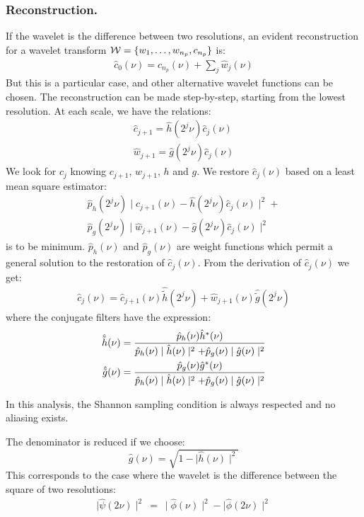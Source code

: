 \subsubsection*{Reconstruction.}
If the wavelet is the difference between two resolutions,
an evident reconstruction for a wavelet transform 
${\cal W} = \{w_1,\dots, w_{n_p}, c_{n_p}\}$ is:
\begin{eqnarray}
\hat c_0(\nu) = \hat c_{n_p}(\nu) + \sum_j \hat w_j(\nu)
\end{eqnarray}
But this is a particular case, and other alternative wavelet functions can be
chosen. The reconstruction can be made step-by-step, starting from
the lowest resolution. At each scale, we have the relations:
\begin{eqnarray}
\hat c_{j+1} = \hat h(2^j \nu) \hat c_j(\nu) \\
\hat w_{j+1} = \hat g(2^j \nu) \hat c_j(\nu) 
\end{eqnarray}
We look for $c_j$ knowing $c_{j+1}$, $w_{j+1}$, $h$ and $g$.
We restore $\hat c_j(\nu)$ based on a least mean square estimator:
\begin{eqnarray}
\hat p_h(2^j\nu) \mid \hat c_{j+1}(\nu)-\hat h(2^j\nu)\hat c_j(\nu) \mid^2 + 
\nonumber \\
\hat p_g(2^j\nu) \mid \hat w_{j+1}(\nu)-\hat g(2^j\nu)\hat c_j(\nu) \mid^2
\end{eqnarray}
is to be minimum. $\hat p_h(\nu)$ and $\hat p_g(\nu)$ are weight
functions which permit a general solution to the
restoration of $\hat c_j(\nu)$. From the derivation of $\hat c_j(\nu)$  we get:
\begin{eqnarray}
\hat{c}_{j}(\nu)=\hat{c}_{j+1}(\nu) \hat{\tilde h}(2^{j}\nu)
                +\hat{w}_{j+1}(\nu) \hat{\tilde g}(2^{j}\nu)
\label{restauration}
\end{eqnarray} 
where the conjugate filters have the expression:
\begin{eqnarray}
\hat{\tilde h}(\nu) & = {\hat{p}_h(\nu) \hat{h}^*(\nu)\over \hat{p}_h(\nu)
\mid \hat{h}(\nu)\mid^2 + \hat{p}_g(\nu)\mid \hat{g}(\nu)\mid^2} \label{eqnht} \\ 
\hat{\tilde g}(\nu) & = {\hat{p}_g(\nu) \hat{g}^*(\nu)\over \hat p_h(\nu)
\mid \hat{h}(\nu)\mid^2 + \hat{p}_g(\nu)\mid \hat{g}(\nu)\mid^2}
\label{eqngt}
\end{eqnarray}

In this analysis, the
Shannon sampling condition is always respected and no aliasing
exists.

The denominator is reduced if we choose:
\[\hat{g}(\nu) = \sqrt{1 - \mid\hat{h}(\nu)\mid^2}\]
This corresponds to the case where the wavelet is the difference between
the square of two resolutions:
\begin{eqnarray}
\mid \hat \psi(2\nu)\mid^2  \ = \ \mid \hat \phi(\nu)\mid^2  - \mid  \hat
\phi(2\nu)\mid^2 
\end{eqnarray}

